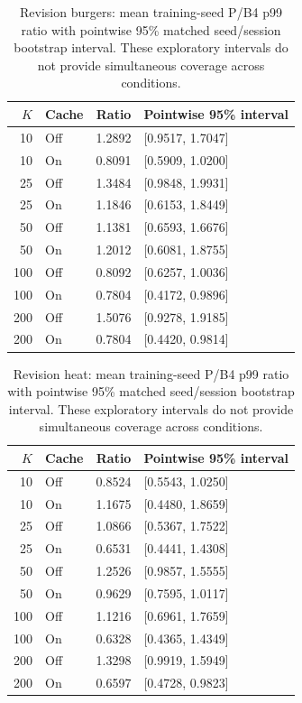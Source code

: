 \begin{table}[ht]
\centering\small
\caption{Revision burgers: mean training-seed P/B4 p99 ratio with pointwise 95\% matched seed/session bootstrap interval. These exploratory intervals do not provide simultaneous coverage across conditions.}\label{tab:e2_ratio_burgers}
\begin{tabular}{@{}rlrl@{}}\toprule
$K$ & Cache & Ratio & Pointwise 95\% interval\\\midrule
10 & Off & 1.2892 & [0.9517, 1.7047]\\
10 & On & 0.8091 & [0.5909, 1.0200]\\
25 & Off & 1.3484 & [0.9848, 1.9931]\\
25 & On & 1.1846 & [0.6153, 1.8449]\\
50 & Off & 1.1381 & [0.6593, 1.6676]\\
50 & On & 1.2012 & [0.6081, 1.8755]\\
100 & Off & 0.8092 & [0.6257, 1.0036]\\
100 & On & 0.7804 & [0.4172, 0.9896]\\
200 & Off & 1.5076 & [0.9278, 1.9185]\\
200 & On & 0.7804 & [0.4420, 0.9814]\\
\bottomrule\end{tabular}
\end{table}

\begin{table}[ht]
\centering\small
\caption{Revision heat: mean training-seed P/B4 p99 ratio with pointwise 95\% matched seed/session bootstrap interval. These exploratory intervals do not provide simultaneous coverage across conditions.}\label{tab:e2_ratio_heat}
\begin{tabular}{@{}rlrl@{}}\toprule
$K$ & Cache & Ratio & Pointwise 95\% interval\\\midrule
10 & Off & 0.8524 & [0.5543, 1.0250]\\
10 & On & 1.1675 & [0.4480, 1.8659]\\
25 & Off & 1.0866 & [0.5367, 1.7522]\\
25 & On & 0.6531 & [0.4441, 1.4308]\\
50 & Off & 1.2526 & [0.9857, 1.5555]\\
50 & On & 0.9629 & [0.7595, 1.0117]\\
100 & Off & 1.1216 & [0.6961, 1.7659]\\
100 & On & 0.6328 & [0.4365, 1.4349]\\
200 & Off & 1.3298 & [0.9919, 1.5949]\\
200 & On & 0.6597 & [0.4728, 0.9823]\\
\bottomrule\end{tabular}
\end{table}
